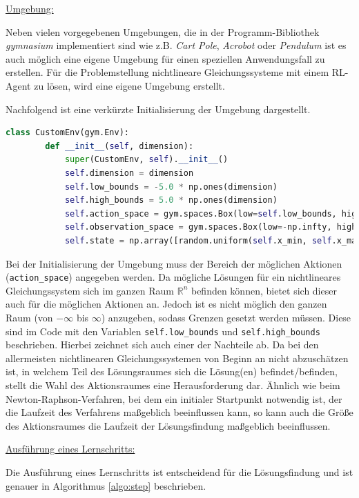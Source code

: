 \documentclass{article}
\def\code#1{\texttt{#1}}
\theoremstyle{newline}
\begin{document}
\begin{onehalfspace}
\underline{Umgebung:}
\smallskip

Neben vielen vorgegebenen Umgebungen, die in der Programm-Bibliothek \textit{gymnasium} implementiert sind wie z.B. \textit{Cart Pole}, \textit{Acrobot} oder \textit{Pendulum} ist es auch möglich eine eigene Umgebung für einen speziellen Anwendungsfall zu erstellen. Für die Problemstellung nichtlineare Gleichungssysteme mit einem RL-Agent zu lösen, wird eine eigene Umgebung erstellt. 

Nachfolgend ist eine verkürzte Initialisierung der Umgebung dargestellt.

\begin{lstlisting}[language=Python, caption={Initialisierung der Umgebung}, label={lst:python}]
	class CustomEnv(gym.Env):
		def __init__(self, dimension):
			super(CustomEnv, self).__init__()
			self.dimension = dimension
			self.low_bounds = -5.0 * np.ones(dimension)
			self.high_bounds = 5.0 * np.ones(dimension)
			self.action_space = gym.spaces.Box(low=self.low_bounds, high=self.high_bounds, dtype=np.float64)
			self.observation_space = gym.spaces.Box(low=-np.infty, high=np.infty, shape=(dimension,))
			self.state = np.array([random.uniform(self.x_min, self.x_max), random.uniform(self.y_min, self.y_max)] + [0.0] * dimension)	
\end{lstlisting}

Bei der Initialisierung der Umgebung muss der Bereich der möglichen Aktionen (\code{action\_space}) angegeben werden. Da mögliche Lösungen für ein nichtlineares Gleichungssystem sich im ganzen Raum $\mathbb{R}^n$ befinden können, bietet sich dieser auch für die möglichen Aktionen an. Jedoch ist es nicht möglich den ganzen Raum (von $-\infty$ bis $\infty$) anzugeben, sodass Grenzen gesetzt werden müssen. Diese sind im Code mit den Variablen \code{self.low\_bounds} und \code{self.high\_bounds} beschrieben. Hierbei zeichnet sich auch einer der Nachteile ab. Da bei den allermeisten nichtlinearen Gleichungssystemen von Beginn an nicht abzuschätzen ist, in welchem Teil des Lösungsraumes sich die Lösung(en) befindet/befinden, stellt die Wahl des Aktionsraumes eine Herausforderung dar. Ähnlich wie beim Newton-Raphson-Verfahren, bei dem ein initialer Startpunkt notwendig ist, der die Laufzeit des Verfahrens maßgeblich beeinflussen kann, so kann auch die Größe des Aktionsraumes die Laufzeit der Lösungsfindung maßgeblich beeinflussen.
\bigskip

\underline{Ausführung eines Lernschritts:}
\smallskip

Die Ausführung eines Lernschritts ist entscheidend für die Lösungsfindung und ist genauer in Algorithmus \ref{algo:step} beschrieben.


\end{onehalfspace}
\end{document}
